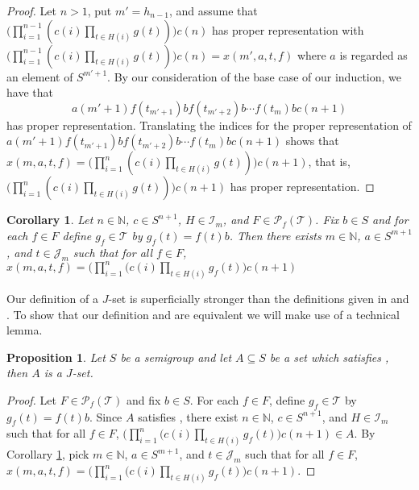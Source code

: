 \documentclass[12pt]{article}
\theoremstyle{plain}
\newtheorem{cor}[thm]{Corollary}
\newtheorem{prop}[thm]{Proposition}
\theoremstyle{definition}
\newcommand{\bbN}{\mathbb{N}}
\newcommand{\calI}{\mathcal{I}}
\newcommand{\calJ}{\mathcal{J}}
\newcommand{\calT}{\mathcal{T}}
\newcommand{\Pf}{\mathcal{P}_f}
\begin{document}
\begin{proof}
  Let $n > 1$, put $m' = h_{n-1}$, and assume that $\bigl(\prod_{i=1}^{n-1} ( c(i)\prod_{t \in H(i)} g(t)) \bigr) c(n)$ has proper representation with $\bigl(\prod_{i=1}^{n-1} ( c(i)\prod_{t \in H(i)} g(t)) \bigr) c(n) = x(m', a, t, f)$ where $a$ is regarded as an element of $S^{m'+1}$.
  By our consideration of the base case of our induction, we have that 
  \[
    a(m'+1)f(t_{m'+1})bf(t_{m'+2})b \cdots f(t_m)bc(n+1)
  \]
has proper representation. 
  Translating the indices for the proper representation of $a(m'+1)f(t_{m'+1})bf(t_{m'+2})b \cdots f(t_m)bc(n+1)$ shows that $x(m, a, t, f) = \bigl(\prod_{i=1}^{n} ( c(i)\prod_{t \in H(i)} g(t)) \bigr) c(n+1)$, that is, $\bigl(\prod_{i=1}^{n} ( c(i)\prod_{t \in H(i)} g(t)) \bigr) c(n+1)$ has proper representation. 
\end{proof}

\begin{cor}
  \label{cor:stJsets}
  Let $n \in \bbN$, $c \in S^{n+1}$, $H \in \calI_m$, and $F \in
  \Pf(\calT)$. 
  Fix $b \in S$ and for each $f \in F$ define $g_f \in \calT$ by
  $g_f(t) = f(t)b$. 
  Then there exists $m \in \bbN$, $a \in S^{m+1}$, and $t \in \calJ_m$
  such that for all $f \in F$, $x(m, a, t, f) = \bigl(\prod_{i=1}^n(
  c(i) \prod_{t \in H(i)} g_f(t)\bigr) c(n+1)$
\end{cor}

Our definition of a $J$-set is superficially stronger than the
definitions given in \cite[Definition 2.3(d)]{Hindman:2010fk} and
\cite[Definition 3.3(e)]{De:2008uq}. 
To show that our definition and \cite[Definition
2.3(d)]{Hindman:2010fk} are equivalent we will make use of a technical
lemma.
\begin{prop}
  Let $S$ be a semigroup and let $A \subseteq S$ be a set which
  satisfies \cite[Definition 2.3(d)]{Hindman:2010fk}, then $A$ is a $J$-set.
\end{prop}
\begin{proof}
  Let $F \in \Pf(\calT)$ and fix $b \in S$. 
  For each $f \in F$, define $g_f \in \calT$ by $g_f(t) = f(t)b$. 
  Since $A$ satisfies \cite[Definition 2.3(d)]{Hindman:2010fk}, there
  exist $n \in \bbN$, $c \in S^{n+1}$, and $H \in \calI_m$ such that
  for all $f \in F$, $\bigl(\prod_{i=1}^n( c(i) \prod_{t \in H(i)}
  g_f(t)\bigr) c(n+1) \in A$.
  By Corollary \ref{cor:stJsets}, pick $m \in \bbN$, $a \in S^{m+1}$,
  and $t \in \calJ_m$ such that for all $f \in F$, $x(m, a, t, f) =
  \bigl(\prod_{i=1}^n( c(i) \prod_{t \in H(i)} g_f(t)\bigr) c(n+1)$.
\end{proof}
\end{document}
